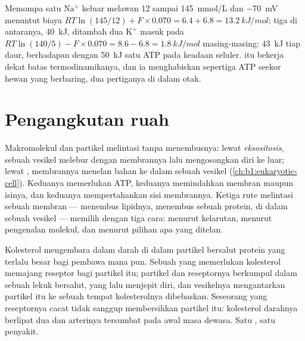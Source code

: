 \begin{example}\label{ex:b1:membranes-transport:pumpcost}
Memompa satu $\mathrm{Na^+}$ keluar melawan \qty{12}{} sampai
\qty{145}{mmol/L} dan \qty{-70}{mV} menuntut biaya
$RT\ln(145/12) + F\times 0.070 = 6.4 + 6.8 =
\qty{13.2}{kJ/mol}$; tiga di antaranya, \qty{40}{kJ}, ditambah dua
$\mathrm{K^+}$ masuk pada $RT\ln(140/5) - F\times 0.070 = 8.6 - 6.8 =
\qty{1.8}{kJ/mol}$ masing-masing: \qty{43}{kJ} tiap daur, berhadapan
dengan \qty{50}{kJ} satu ATP pada keadaan seluler.  itu bekerja
dekat batas termodinamikanya, dan ia menghabiskan sepertiga ATP seekor
hewan yang berbaring, dua pertiganya di dalam otak.
\end{example}

\section{Pengangkutan ruah}

\begin{proposition}\label{prop:b1:membranes-transport:vesicles}
Makromolekul dan partikel melintasi  tanpa menembusnya:
lewat \emph{eksositosis}, sebuah vesikel melebur dengan membrannya lalu
mengosongkan diri ke luar; lewat \emph{}, membrannya menelan
bahan ke dalam sebuah vesikel (\cref{ch:b1:eukaryotic-cell}). Keduanya
memerlukan ATP, keduanya memindahkan membran maupun isinya, dan keduanya
mempertahankan sisi membrannya. Ketiga rute melintasi sebuah membran ---
menembus lipidnya, menembus sebuah protein, di dalam sebuah vesikel ---
memilih dengan tiga cara: menurut kelarutan, menurut pengenalan molekul,
dan menurut pilihan apa yang ditelan.
\end{proposition}

\begin{example}\label{ex:b1:membranes-transport:ldl}
Kolesterol mengembara dalam darah di dalam partikel bersalut protein
yang terlalu besar bagi pembawa mana pun. Sebuah  yang memerlukan
kolesterol memajang reseptor bagi partikel itu; partikel dan reseptornya
berkumpul dalam sebuah lekuk bersalut, yang lalu menjepit diri, dan
vesikelnya mengantarkan partikel itu ke sebuah  tempat
kolesterolnya dibebaskan. Seseorang yang reseptornya cacat tidak sanggup
membersihkan partikel itu: kolesterol darahnya berlipat dua dan arterinya
tersumbat pada awal masa dewasa. Satu , satu penyakit.
\end{example}

